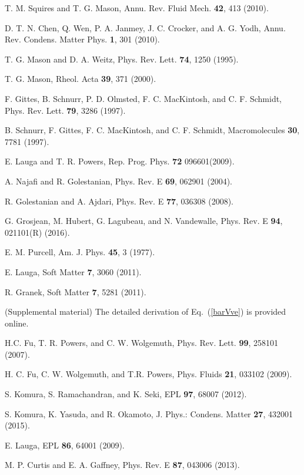 \documentclass[nofootinbib,twocolumn,showpacs,preprintnumbers,pre,aps]{revtex4-1}
\begin{document}
\begin{thebibliography}{99}

T. M. Squires and T. G. Mason, 
Annu. Rev. Fluid Mech. \textbf{42}, 413 (2010).

D. T. N. Chen, Q. Wen, P. A. Janmey, J. C. Crocker, and A. G. Yodh, 
Annu. Rev. Condens. Matter Phys. \textbf{1}, 301 (2010).

T. G. Mason and D. A. Weitz,
Phys. Rev. Lett. \textbf{74}, 1250 (1995).

T. G. Mason, 
Rheol. Acta \textbf{39}, 371 (2000).

F. Gittes, B. Schnurr, P. D. Olmsted,  F. C. MacKintosh, and C. F. Schmidt, 
Phys. Rev. Lett. \textbf{79}, 3286 (1997).

B. Schnurr, F. Gittes, F. C. MacKintosh, and C. F. Schmidt, 
Macromolecules \textbf{30}, 7781 (1997).

E. Lauga and T. R. Powers, 
Rep. Prog. Phys. \textbf{72} 096601(2009).

A. Najafi and R. Golestanian, 
Phys. Rev. E \textbf{69}, 062901 (2004).

R. Golestanian and A. Ajdari, 
Phys. Rev. E \textbf{77}, 036308 (2008).

G. Grosjean, M. Hubert, G. Lagubeau, and N. Vandewalle,
Phys. Rev. E \textbf{94}, 021101(R) (2016).

E. M. Purcell, 
Am. J. Phys. \textbf{45}, 3 (1977). 

E. Lauga, 
Soft Matter \textbf{7}, 3060 (2011).

R. Granek, 
Soft Matter \textbf{7}, 5281 (2011).

(Supplemental material) The detailed derivation of Eq.~(\ref{barVve}) is provided online.
 
H.C. Fu, T. R. Powers, and C. W. Wolgemuth,
Phys. Rev. Lett. \textbf{99}, 258101 (2007).

H. C. Fu, C. W. Wolgemuth, and T.R. Powers, 
Phys. Fluids \textbf{21}, 033102 (2009).

S. Komura, S. Ramachandran, and K. Seki, 
EPL \textbf{97}, 68007 (2012).

S. Komura, K. Yasuda, and R. Okamoto, 
J. Phys.: Condens. Matter \textbf{27}, 432001 (2015).

E. Lauga, 
EPL \textbf{86}, 64001 (2009).

M. P. Curtis and E. A. Gaffney, 
Phys. Rev. E \textbf{87}, 043006 (2013).

\end{thebibliography}
\end{document}
